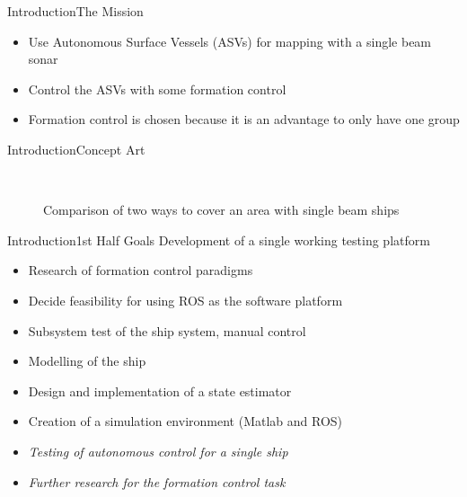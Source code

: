 \documentclass[10pt,handout]{beamer}
\begin{document}
\begin{frame}{Introduction}{The Mission}
\begin{itemize}
\item Use Autonomous Surface Vessels (ASVs) for mapping with a single beam sonar
\item Control the ASVs with some formation control
\item Formation control is chosen because it is an advantage to only have one group
\end{itemize}
\end{frame}

\begin{frame}{Introduction}{Concept Art}
\begin{figure}
  \centering
  \ %
  \caption{Comparison of two ways to cover an area with single beam ships}
  \label{fig:concept-art}
\end{figure}
\end{frame}

\begin{frame}{Introduction}{1st Half Goals}
Development of a single working testing platform
  \begin{itemize}
  \item Research of formation control paradigms
  \item Decide feasibility for using ROS as the software platform
  \item Subsystem test of the ship system, manual control
  \item Modelling of the ship
  \item Design and implementation of a state estimator
  \item Creation of a simulation environment (Matlab and ROS)
  \item \textit{Testing of autonomous control for a single ship}
  \item \textit{Further research for the formation control task}
  \end{itemize}
\end{frame}
\end{document}
